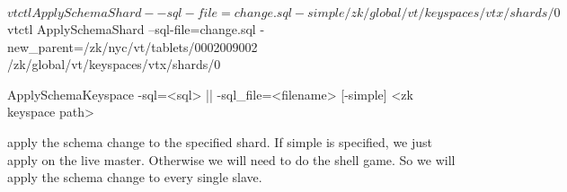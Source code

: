\begin{codesample2}
$ vtctl ApplySchemaShard --sql-file=change.sql 
                     -simple /zk/global/vt/keyspaces/vtx/shards/0
$ vtctl ApplySchemaShard --sql-file=change.sql 
      -new\_parent=/zk/nyc/vt/tablets/0002009002 /zk/global/vt/keyspaces/vtx/shards/0
\end{codesample2}

\begin{codesample2}
  ApplySchemaKeyspace {-sql=<sql> || -sql_file=<filename>} 
                                  [-simple] <zk keyspace path> 
\end{codesample2}

apply the schema change to the specified shard. If simple is specified, we just apply on the live master. Otherwise we will need to do the shell game. So we will apply the schema change to every single slave. 

